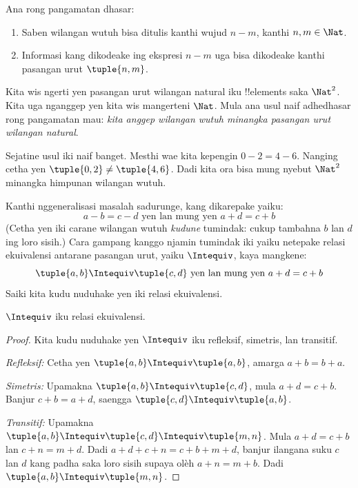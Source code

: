 \documentclass[../../../include/open-logic-section]{subfiles}
\begin{document}

Ana rong pangamatan dhasar:
	\begin{enumerate}
		\item Saben wilangan wutuh bisa ditulis kanthi wujud $n - m$, kanthi $n, m \in\Nat$.
		\item Informasi kang dikodeake ing ekspresi $n - m$ uga bisa dikodeake kanthi pasangan urut $\tuple{n, m}$.
	\end{enumerate}
Kita wis ngerti yen pasangan urut wilangan natural iku !!{element}s saka $\Nat^2$. Kita uga nganggep yen kita wis mangerteni $\Nat$. Mula ana usul naif adhedhasar rong pangamatan mau: \emph{kita anggep wilangan wutuh minangka pasangan urut wilangan natural}.

Sejatine usul iki naif banget. Mesthi wae kita kepengin $0- 2 = 4 - 6$. Nanging cetha yen $\tuple{0, 2 }\neq \tuple{4, 6}$. Dadi kita ora bisa mung nyebut $\Nat^2$ minangka himpunan wilangan wutuh.

Kanthi nggeneralisasi masalah sadurunge, kang dikarepake yaiku:
	$$a - b = c - d \text{ yen lan mung yen }a + d = c + b$$
(Cetha yen iki carane wilangan wutuh \emph{kudune} tumindak: cukup tambahna $b$ lan $d$ ing loro sisih.) Cara gampang kanggo njamin tumindak iki yaiku netepake relasi ekuivalensi antarane pasangan urut, yaiku $\Intequiv$, kaya mangkene:
$$\tuple{ a, b } \Intequiv \tuple{c, d}\text{ yen lan mung yen }a + d = c + b$$
Saiki kita kudu nuduhake yen iki relasi ekuivalensi.
\begin{prop} $\Intequiv$ iku relasi ekuivalensi.
\end{prop}
	\begin{proof}
	Kita kudu nuduhake yen $\Intequiv$ iku refleksif, simetris, lan transitif.

	\emph{Refleksif:} Cetha yen $\tuple{a, b} \Intequiv \tuple{a, b}$, amarga $a + b = b + a$.

	\emph{Simetris:} Upamakna $\tuple{a, b} \Intequiv \tuple{c, d}$, mula $a + d = c + b$. Banjur $c + b = a + d$, saengga $\tuple{c, d} \Intequiv \tuple{a, b}$.

	\emph{Transitif:} Upamakna $\tuple{a, b} \Intequiv \tuple{c, d}\Intequiv \tuple{m, n}$. Mula $a + d = c + b$ lan $c + n = m + d$. Dadi $a + d + c + n = c + b + m + d$, banjur ilangana suku $c$ lan $d$ kang padha saka loro sisih supaya olèh $a + n = m + b$. Dadi $\tuple{a, b } \Intequiv \tuple{m, n}$.
\end{proof}
\end{document}
